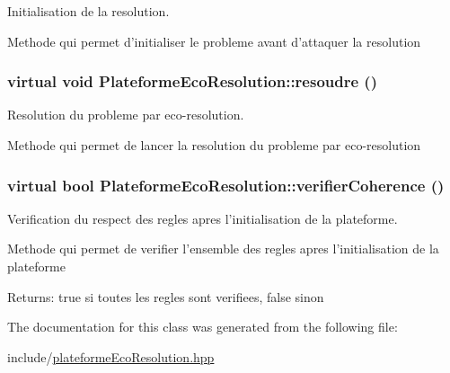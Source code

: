 Initialisation de la resolution. 

Methode qui permet d'initialiser le probleme avant d'attaquer la resolution \hypertarget{classPlateformeEcoResolution_17f587580cd8aee537551bc0ddd82bef}{
\subsubsection[{resoudre}]{\setlength{\rightskip}{0pt plus 5cm}virtual void PlateformeEcoResolution::resoudre ()}}
\label{classPlateformeEcoResolution_17f587580cd8aee537551bc0ddd82bef}


Resolution du probleme par eco-resolution. 

Methode qui permet de lancer la resolution du probleme par eco-resolution \hypertarget{classPlateformeEcoResolution_4b7bc97302e1845f2b972499e1faf8b4}{
\subsubsection[{verifierCoherence}]{\setlength{\rightskip}{0pt plus 5cm}virtual bool PlateformeEcoResolution::verifierCoherence ()}}
\label{classPlateformeEcoResolution_4b7bc97302e1845f2b972499e1faf8b4}


Verification du respect des regles apres l'initialisation de la plateforme. 

Methode qui permet de verifier l'ensemble des regles apres l'initialisation de la plateforme

\begin{Desc}
\item[Returns:]true si toutes les regles sont verifiees, false sinon \end{Desc}


The documentation for this class was generated from the following file:\begin{CompactItemize}
\item 
include/\hyperlink{plateformeEcoResolution_8hpp}{plateformeEcoResolution.hpp}\end{CompactItemize}
